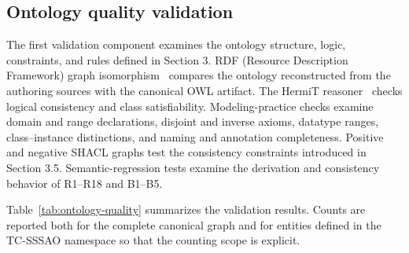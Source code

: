 \documentclass[Royal,sageh,times]{sagej}
\begin{document}
\subsection{Ontology quality validation}

The first validation component examines the ontology structure, logic, constraints, and rules defined in Section 3. RDF (Resource Description Framework) graph isomorphism~\citep{rdf2014} compares the ontology reconstructed from the authoring sources with the canonical OWL artifact. The HermiT reasoner~\citep{glimm2014hermit} checks logical consistency and class satisfiability. Modeling-practice checks examine domain and range declarations, disjoint and inverse axioms, datatype ranges, class--instance distinctions, and naming and annotation completeness. Positive and negative SHACL graphs test the consistency constraints introduced in Section 3.5. Semantic-regression tests examine the derivation and consistency behavior of R1--R18 and B1--B5.

Table~\ref{tab:ontology-quality} summarizes the validation results. Counts are reported both for the complete canonical graph and for entities defined in the TC-SSSAO namespace so that the counting scope is explicit.
\end{document}
